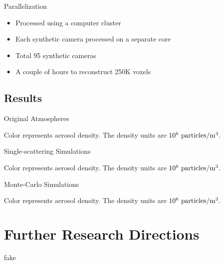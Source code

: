 \documentclass[compress,red,12pt]{beamer}
\begin{document}
\begin{frame}{Parallelization}
  \begin{itemize}
  \item Processed using a computer cluster
  \item Each synthetic camera processed on a separate core
  \item Total 95 synthetic cameras
  \item A couple of hours to reconstruct 250K voxels
  \end{itemize}
\end{frame}

\subsection{Results}

\begin{frame}{Original Atmospheres}
  \centerline{\def\svgwidth{1.15\linewidth}\footnotesize{}}
  \centerline{\footnotesize Color represents aerosol density. The
    density units are $10^{6}~{\rm particles}/{\rm m}^3.$}
\end{frame}

\begin{frame}{Single-scattering Simulations}
  \centerline{\def\svgwidth{1.15\linewidth}\footnotesize{}}
  \centerline{\footnotesize Color represents aerosol density. The
    density units are $10^{6}~{\rm particles}/{\rm m}^3.$}
\end{frame}

\begin{frame}{Monte-Carlo Simulations}
  \centerline{\def\svgwidth{1.15\linewidth}\footnotesize{}}
  \centerline{\footnotesize Color represents aerosol density. The
    density units are $10^{6}~{\rm particles}/{\rm m}^3.$}
\end{frame}


\section{Further Research Directions}

\begin{frame}{fake}
  
\end{frame}
\end{document}

